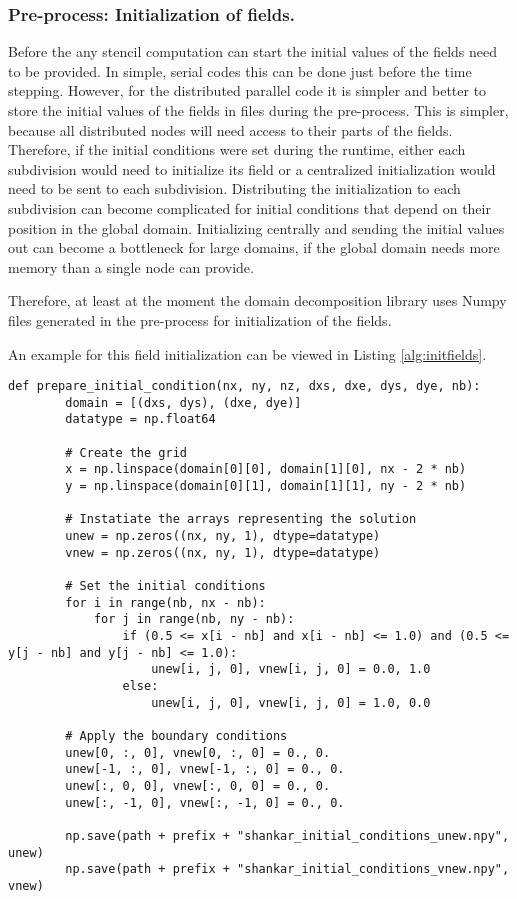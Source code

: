 \subsubsection{Pre-process: Initialization of fields.}
Before the any stencil computation can start the initial values of the fields need to be provided.
In simple, serial codes this can be done just before the time stepping.
However, for the distributed parallel code it is simpler and better to store the initial values of the fields in files during the pre-process.
This is simpler, because all distributed nodes will need access to their parts of the fields.
Therefore, if the initial conditions were set during the runtime, either each subdivision would need to initialize its field or a centralized initialization would need to be sent to each subdivision.
Distributing the initialization to each subdivision can become complicated for initial conditions that depend on their position in the global domain.
Initializing centrally and sending the initial values out can become a bottleneck for large domains, if the global domain needs more memory than a single node can provide.

Therefore, at least at the moment the domain decomposition library uses Numpy files generated in the pre-process for initialization of the fields.

An example for this field initialization can be viewed in Listing \ref{alg:initfields}.

\begin{lstlisting}[caption={Example code of the domain pre-process function to initialize to fields "unew" and "vnew"},captionpos=b, label={alg:initfields}, float, floatplacement=H]
def prepare_initial_condition(nx, ny, nz, dxs, dxe, dys, dye, nb):
        domain = [(dxs, dys), (dxe, dye)]
        datatype = np.float64

        # Create the grid
        x = np.linspace(domain[0][0], domain[1][0], nx - 2 * nb)
        y = np.linspace(domain[0][1], domain[1][1], ny - 2 * nb)

        # Instatiate the arrays representing the solution
        unew = np.zeros((nx, ny, 1), dtype=datatype)
        vnew = np.zeros((nx, ny, 1), dtype=datatype)

        # Set the initial conditions
        for i in range(nb, nx - nb):
            for j in range(nb, ny - nb):
                if (0.5 <= x[i - nb] and x[i - nb] <= 1.0) and (0.5 <= y[j - nb] and y[j - nb] <= 1.0):
                    unew[i, j, 0], vnew[i, j, 0] = 0.0, 1.0
                else:
                    unew[i, j, 0], vnew[i, j, 0] = 1.0, 0.0

        # Apply the boundary conditions
        unew[0, :, 0], vnew[0, :, 0] = 0., 0.
        unew[-1, :, 0], vnew[-1, :, 0] = 0., 0.
        unew[:, 0, 0], vnew[:, 0, 0] = 0., 0.
        unew[:, -1, 0], vnew[:, -1, 0] = 0., 0.

        np.save(path + prefix + "shankar_initial_conditions_unew.npy", unew)
        np.save(path + prefix + "shankar_initial_conditions_vnew.npy", vnew)
\end{lstlisting}

